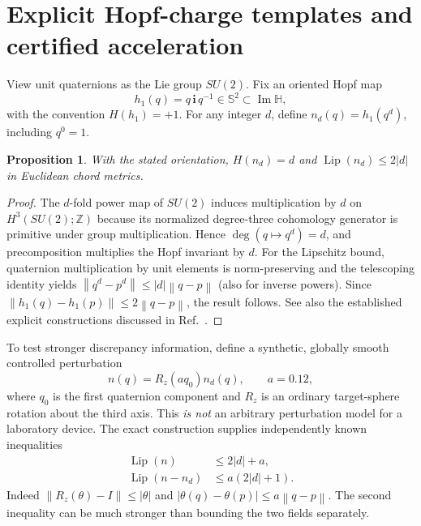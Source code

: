 \documentclass[aps,prd,onecolumn,notitlepage,11pt,superscriptaddress,longbibliography]{revtex4-2}
\newtheorem{proposition}{Proposition}
\newcommand{\Sph}{\mathbb S}
\newcommand{\norm}[1]{\left\lVert#1\right\rVert}
\begin{document}
\section{Explicit Hopf-charge templates and certified acceleration}
View unit quaternions as the Lie group $SU(2)$. Fix an oriented Hopf map
\begin{equation}
h_1(q)=q\,\mathbf i\,q^{-1}\in\Sph^2\subset\operatorname{Im}\mathbb H,
\end{equation}
with the convention $H(h_1)=+1$. For any integer $d$, define $n_d(q)=h_1(q^d)$, including $q^0=1$.
\begin{proposition}\label{prop:degree}
With the stated orientation, $H(n_d)=d$ and $\operatorname{Lip}(n_d)\le2|d|$ in Euclidean chord metrics.
\end{proposition}
\begin{proof}
The $d$-fold power map of $SU(2)$ induces multiplication by $d$ on $H^3(SU(2);\mathbb Z)$ because its normalized degree-three cohomology generator is primitive under group multiplication. Hence $\deg(q\mapsto q^d)=d$, and precomposition multiplies the Hopf invariant by $d$. For the Lipschitz bound, quaternion multiplication by unit elements is norm-preserving and the telescoping identity yields $\norm{q^d-p^d}\le |d|\norm{q-p}$ (also for inverse powers). Since $\norm{h_1(q)-h_1(p)}\le2\norm{q-p}$, the result follows. See also the established explicit constructions discussed in Ref.~\cite{HopfBackground}.
\end{proof}

To test stronger discrepancy information, define a synthetic, globally smooth controlled perturbation
\begin{equation}\label{eq:twist}
n(q)=R_z(aq_0)n_d(q),\qquad a=0.12,
\end{equation}
where $q_0$ is the first quaternion component and $R_z$ is an ordinary target-sphere rotation about the third axis. This \emph{is not} an arbitrary perturbation model for a laboratory device. The exact construction supplies independently known inequalities
\begin{align}
\operatorname{Lip}(n)&\le2|d|+a,\\
\operatorname{Lip}(n-n_d)&\le a(2|d|+1).\label{eq:deltaLip}
\end{align}
Indeed $\norm{R_z(\theta)-I}\le|\theta|$ and $|\theta(q)-\theta(p)|\le a\norm{q-p}$. The second inequality can be much stronger than bounding the two fields separately.
\end{document}
